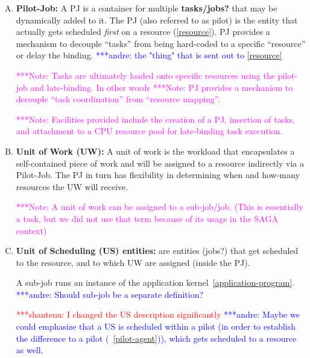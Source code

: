 \documentclass[]{article}
\newcommand{\jhanote}[1]{ {\textcolor{red} { ***shantenu: #1 }}}
\newcommand{\alnote}[1]{ {\textcolor{blue} { ***andre: #1 }}}
\newcommand{\note}[1]{ {\textcolor{magenta} { ***Note: #1 }}}
\newcommand{\alnote}[1]{}
\newcommand{\jhanote}[1]{}
\newcommand{\note}[1]{}
\begin{document}
\begin{enumerate}[A.]

\item\textbf{Pilot-Job:} A PJ is a container for multiple
  \textbf{tasks/jobs?}  that may be dynamically added to it. The PJ
  (also referred to as pilot) is the entity that actually gets
  scheduled {\it first} on a resource (\ref{resource}).  PJ provides a
  mechanism to decouple “tasks'' from being hard-coded to a specific
  “resource'' or delay the binding. \alnote{ the "thing" that is sent
    out to \ref{resource}} \label{pilot-agent}

  \note{Tasks are ultimately loaded onto specific resources using the
    pilot-job and late-binding. In other words} \note{PJ provides a
    mechanism to decouple “task coordination” from “resource
    mapping”.}

  \note{Facilities provided include the creation of a PJ, insertion of
    tasks, and attachment to a CPU resource pool for late-binding task
    execution.}

\item \textbf{Unit of Work (UW):} A unit of work is the workload that 
    encapsulates a self-contained piece of work and will be assigned to a 
    resource indirectly via a Pilot-Job.  The PJ in turn has flexibility in 
    determining when and how-many resources the UW will receive.


  \note{A unit of work can be assigned to a sub-job/job. (This is
    essentially a task, but we did not use that term because of its
    usage in the SAGA context)}

\item \textbf{Unit of Scheduling (US) entities:} are entities (jobs?)
  that get scheduled to the resource, and to which UW are assigned
  (inside the PJ).


  A sub-job runs an instance of the application
  kernel~\ref{application-program}. \alnote{Should sub-job be a
    separate definition?}

\jhanote{I changed the US description significantly} \alnote{Maybe we could 
emphasize that a US is scheduled within a pilot (in order to establish the 
difference to a pilot (~\ref{pilot-agent})), which gets scheduled to a resource 
as well.}



\end{enumerate}
\end{document}
